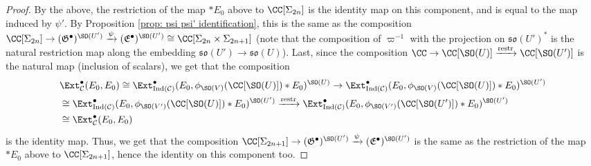 \documentclass[11pt]{article}
\begin{document}
\begin{proof}
    By the above, the restriction of the map $*E_0$ above to $\CC[\Sigma_{2n}]$ is the identity map on this component, and is equal to the map induced by $\psi'$. By Proposition \ref{prop: psi psi' identification}, this is the same as the composition $\CC[\Sigma_{2n}]\to (\mathfrak{G}^\bullet)^{\SO(U')}\xrightarrow{\psi} (\mathfrak{E}^\bullet)^{\SO(U')}\cong \CC[\Sigma_{2n}\times \Sigma_{2n+1}]$ (note that the composition of $\varpi^{-1}$ with the projection on $\mathfrak{so}(U')^*$ is the natural restriction map along the embedding $\mathfrak{so}(U')\to \mathfrak{so}(U)$).
    Last, since the composition $\CC\to \CC[\SO(U)] \xrightarrow{\mathrm{restr}} \CC[\SO(U')]$ is the natural map (inclusion of scalars), we get that the composition $$\begin{aligned}
        &\Ext^\bullet_{\mathcal{C}}(E_0, E_0)\cong \Ext^\bullet_{\mathrm{Ind}(\mathcal{C})}(E_0, \phi_{\SO(V)}(\CC[\SO(U)])*E_0)^{\SO(U)} \to \Ext^\bullet_{\mathrm{Ind}(\mathcal{C})}(E_0, \phi_{\SO(V)}(\CC[\SO(U)])*E_0)^{\SO(U')}\\
        & \cong \Ext^\bullet_{\mathrm{Ind}(\mathcal{C})}(E_0, \phi_{\SO(V')}(\CC[\SO(U)])*E_0)^{\SO(U')}
        \xrightarrow{\mathrm{restr}} \Ext^\bullet_{\mathrm{Ind}(\mathcal{C})}(E_0, \phi_{\SO(V')}(\CC[\SO(U')])*E_0)^{\SO(U')}
        \\&\cong \Ext^\bullet_{\mathcal{C}}(E_0, E_0)
    \end{aligned}$$
    is the identity map.
    Thus, we get that the composition $\CC[\Sigma_{2n+1}]\to (\mathfrak{G}^\bullet)^{\SO(U')}\xrightarrow{\psi} (\mathfrak{E}^\bullet)^{\SO(U')}$ is the same as the restriction of the map $*E_0$ above to $\CC[\Sigma_{2n+1}]$, hence the identity on this component too.
\end{proof}
\end{document}
